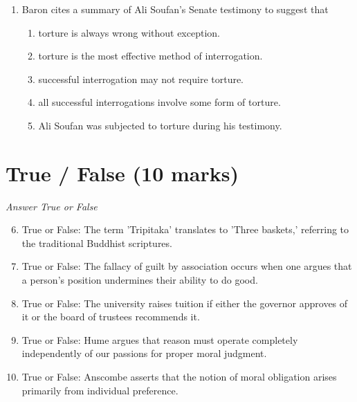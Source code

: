 \documentclass[12pt]{article}
\begin{document}
\begin{enumerate}[label=\arabic*.]
\begin{enumerate}[label=(\alph*)]
    \item love.
    \item truth.
    \item justice.
    \item faith.
    \item greed.
\end{enumerate}
\item Baron cites a summary of Ali Soufan's Senate testimony to suggest that
\begin{enumerate}[label=(\alph*)]
    \item torture is always wrong without exception.
    \item torture is the most effective method of interrogation.
    \item successful interrogation may not require torture.
    \item all successful interrogations involve some form of torture.
    \item Ali Soufan was subjected to torture during his testimony.
\end{enumerate}
\end{enumerate}

\section*{True / False (10 marks)}
\textit{Answer True or False}
\begin{enumerate}[label=\arabic*.]
\setcounter{enumi}{5}
\item True or False: The term 'Tripitaka' translates to 'Three baskets,' referring to the traditional Buddhist scriptures.
\item True or False: The fallacy of guilt by association occurs when one argues that a person's position undermines their ability to do good.
\item True or False: The university raises tuition if either the governor approves of it or the board of trustees recommends it.
\item True or False: Hume argues that reason must operate completely independently of our passions for proper moral judgment.
\item True or False: Anscombe asserts that the notion of moral obligation arises primarily from individual preference.
\end{enumerate}
\end{document}
